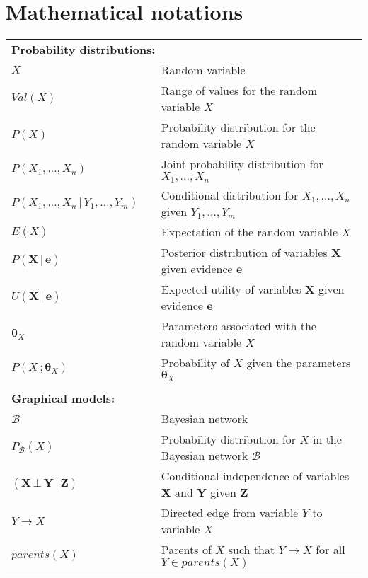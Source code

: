 
\chapter*{Mathematical notations}
\thispagestyle{empty}
\pagestyle{empty}                                                           

\begin{longtable}{lp{5mm}p{95mm}}
\multicolumn{3}{l}{\textbf{Probability distributions:}} \vspace{2mm} \\
$X$ && Random variable \\
$\mathit{Val}(X)$ && Range of values for the random variable $X$ \\
$P(X)$ && Probability distribution for the random variable $X$ \\
$P(X_1, \dots, X_n)$ && Joint probability distribution for $X_1, \dots, X_n$ \\
$P(X_1, \dots, X_n \, | \, Y_1, \dots, Y_m)$ && Conditional distribution for $X_1, \dots, X_n$ given $Y_1, \dots, Y_m$  \\ 
$E(X)$ && Expectation of the random variable $X$ \\
 $P(\mathbf{X}  \, | \,  \mathbf{e})$ && Posterior distribution of variables $\mathbf{X}$ given evidence $\mathbf{e}$ \\ 
 $U(\mathbf{X} \, | \,  \mathbf{e})$ && Expected utility of variables $\mathbf{X}$ given evidence $\mathbf{e}$ \\ 
 $\boldsymbol\theta_{X}$ && Parameters associated with the random variable $X$ \\ 
 $P(X\,;\boldsymbol\theta_{X})$ && Probability of $X$ given the parameters $\boldsymbol\theta_{X}$ \\ 
 
&&  \vspace{0mm} \\
\multicolumn{3}{l}{\textbf{Graphical models:}} \vspace{2mm} \\
 $\mathcal{B}$ && Bayesian network \\
 $P_\mathcal{B}(X)$ && Probability distribution for $X$ in the Bayesian network $\mathcal{B}$ \\ 
$(\mathbf{X} \, \bot \, \mathbf{Y} \, | \, \mathbf{Z})$ && Conditional independence of variables $\mathbf{X} $ and $\mathbf{Y}$ given $\mathbf{Z}$ \\
$Y \rightarrow X$ && Directed edge from variable $Y$ to variable $X$ \\
$\mathit{parents}(X)$ && Parents of $X$ such that $Y \rightarrow X$ for all $Y\!\in\!parents(X)$ \\


\end{longtable}
